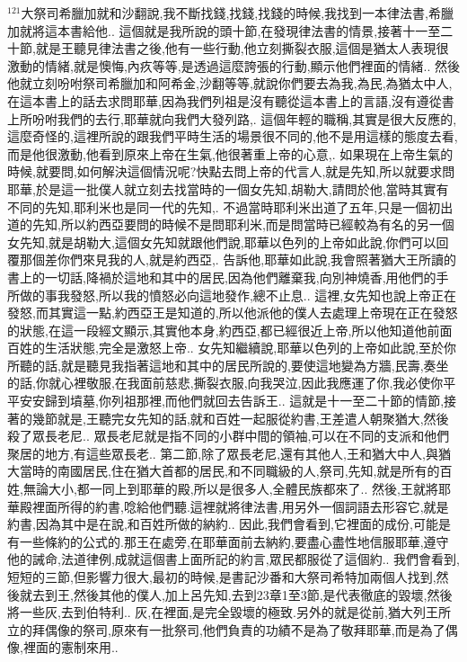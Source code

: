 \documentclass{book}
\begin{document}
$^{121}$大祭司希臘加就和沙翻說,我不斷找錢,找錢,找錢的時候,我找到一本律法書,希臘加就將這本書給他..
這個就是我所說的頭十節,在發現律法書的情景,接著十一至二十節,就是王聽見律法書之後,他有一些行動,他立刻撕裂衣服,這個是猶太人表現很激動的情緒,就是懊悔,內疚等等,是透過這麼誇張的行動,顯示他們裡面的情緒..
然後他就立刻吩咐祭司希臘加和阿希金,沙翻等等,就說你們要去為我,為民,為猶太中人,在這本書上的話去求問耶華,因為我們列祖是沒有聽從這本書上的言語,沒有遵從書上所吩咐我們的去行,耶華就向我們大發列路,.
這個年輕的職稱,其實是很大反應的,這麼奇怪的,這裡所說的跟我們平時生活的場景很不同的,他不是用這樣的態度去看,而是他很激動,他看到原來上帝在生氣,他很著重上帝的心意,.
如果現在上帝生氣的時候,就要問,如何解決這個情況呢?快點去問上帝的代言人,就是先知,所以就要求問耶華,於是這一批僕人就立刻去找當時的一個女先知,胡勒大,請問於他,當時其實有不同的先知,耶利米也是同一代的先知,.
不過當時耶利米出道了五年,只是一個初出道的先知,所以約西亞要問的時候不是問耶利米,而是問當時已經較為有名的另一個女先知,就是胡勒大,這個女先知就跟他們說,耶華以色列的上帝如此說,你們可以回覆那個差你們來見我的人,就是約西亞,.
告訴他,耶華如此說,我會照著猶大王所讀的書上的一切話,降禍於這地和其中的居民,因為他們離棄我,向別神燒香,用他們的手所做的事我發怒,所以我的憤怒必向這地發作,總不止息..
這裡,女先知也說上帝正在發怒,而其實這一點,約西亞王是知道的,所以他派他的僕人去處理上帝現在正在發怒的狀態,在這一段經文顯示,其實他本身,約西亞,都已經很近上帝,所以他知道他前面百姓的生活狀態,完全是激怒上帝..
女先知繼續說,耶華以色列的上帝如此說,至於你所聽的話,就是聽見我指著這地和其中的居民所說的,要使這地變為方牆,民壽,奏坐的話,你就心裡敬服,在我面前慈悲,撕裂衣服,向我哭泣,因此我應運了你,我必使你平平安安歸到墳墓,你列祖那裡,而他們就回去告訴王..
這就是十一至二十節的情節,接著的幾節就是,王聽完女先知的話,就和百姓一起服從約書,王差遣人朝聚猶大,然後殺了眾長老尼..
眾長老尼就是指不同的小群中間的領袖,可以在不同的支派和他們聚居的地方,有這些眾長老..
第二節,除了眾長老尼,還有其他人,王和猶大中人,與猶大當時的南國居民,住在猶大首都的居民,和不同職級的人,祭司,先知,就是所有的百姓,無論大小,都一同上到耶華的殿,所以是很多人,全體民族都來了..
然後,王就將耶華殿裡面所得的約書,唸給他們聽.這裡就將律法書,用另外一個詞語去形容它,就是約書,因為其中是在說,和百姓所做的納約..
因此,我們會看到,它裡面的成份,可能是有一些條約的公式的.那王在處旁,在耶華面前去納約,要盡心盡性地信服耶華,遵守他的誡命,法道律例,成就這個書上面所記的約言,眾民都服從了這個約..
我們會看到,短短的三節,但影響力很大,最初的時候,是書記沙番和大祭司希特加兩個人找到,然後就去到王,然後其他的僕人,加上呂先知,去到23章1至3節,是代表徹底的毀壞,然後將一些灰,去到伯特利..
灰,在裡面,是完全毀壞的極致.另外的就是從前,猶大列王所立的拜偶像的祭司,原來有一批祭司,他們負責的功績不是為了敬拜耶華,而是為了偶像,裡面的憲制來用..
\end{document}
